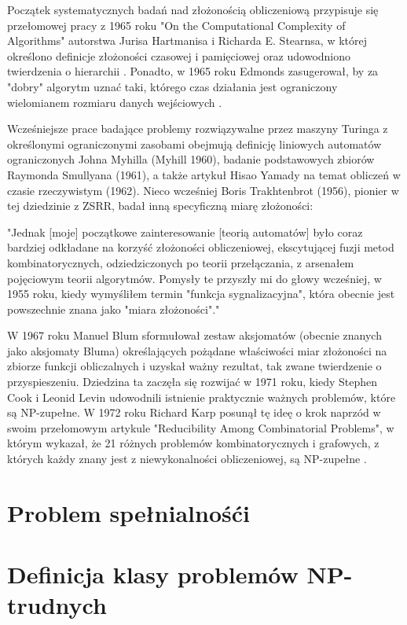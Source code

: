 Początek systematycznych badań nad złożonością obliczeniową przypisuje się przełomowej pracy z 1965 roku "On the Computational Complexity of Algorithms" autorstwa Jurisa Hartmanisa i Richarda E. Stearnsa, w której określono definicje złożoności czasowej i pamięciowej oraz udowodniono twierdzenia o hierarchii \cite{FortnowH03}. Ponadto, w 1965 roku Edmonds zasugerował, by za "dobry" algorytm uznać taki, którego czas działania jest ograniczony wielomianem rozmiaru danych wejściowych \cite{Karp86}.

Wcześniejsze prace badające problemy rozwiązywalne przez maszyny Turinga z określonymi ograniczonymi zasobami obejmują \cite{FortnowH03} definicję liniowych automatów ograniczonych Johna Myhilla (Myhill 1960), badanie podstawowych zbiorów Raymonda Smullyana (1961), a także artykuł Hisao Yamady \cite{Yamada62a} na temat obliczeń w czasie rzeczywistym (1962). Nieco wcześniej Boris Trakhtenbrot (1956), pionier w tej dziedzinie z ZSRR, badał inną specyficzną miarę złożoności:

"Jednak [moje] początkowe zainteresowanie [teorią automatów] było coraz bardziej odkładane na korzyść złożoności obliczeniowej, ekscytującej fuzji metod kombinatorycznych, odziedziczonych po teorii przełączania, z arsenałem pojęciowym teorii algorytmów. Pomysły te przyszły mi do głowy wcześniej, w 1955 roku, kiedy wymyśliłem termin "funkcja sygnalizacyjna", która obecnie jest powszechnie znana jako "miara złożoności"\cite{Trakhtenbrot08}."

W 1967 roku Manuel Blum sformułował zestaw aksjomatów (obecnie znanych jako aksjomaty Bluma) określających pożądane właściwości miar złożoności na zbiorze funkcji obliczalnych i uzyskał ważny rezultat, tak zwane twierdzenie o przyspieszeniu. Dziedzina ta zaczęła się rozwijać w 1971 roku, kiedy Stephen Cook i Leonid Levin udowodnili istnienie praktycznie ważnych problemów, które są NP-zupełne. W 1972 roku Richard Karp posunął tę ideę o krok naprzód w swoim przełomowym artykule "Reducibility Among Combinatorial Problems", w którym wykazał, że 21 różnych problemów kombinatorycznych i grafowych, z których każdy znany jest z niewykonalności obliczeniowej, są NP-zupełne \cite{Karp86}.


\section{Problem spełnialnośći}

\section{Definicja klasy problemów NP-trudnych}



